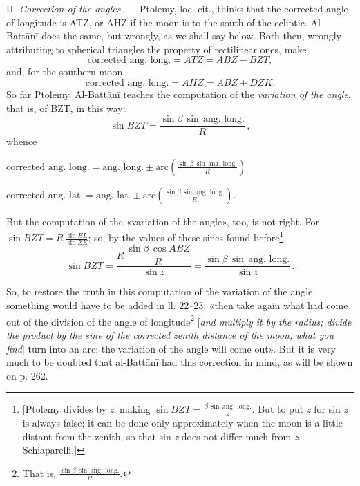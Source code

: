\documentclass[11pt]{article}
\newcommand{\Pg}[1]{\marginpar{\footnotesize\color{gray}#1}}
\begin{document}
\par \Pg{I 261}II. \emph{Correction of the angles.} — Ptolemy, loc. cit., thinks that the corrected angle of longitude is ATZ, or AHZ if the moon is to the south of the ecliptic. Al-Battānī does the same, but wrongly, as we shall say below. Both then, wrongly attributing to spherical triangles the property of rectilinear ones, make \[ \text{corrected ang. long.} = ATZ = ABZ - BZT, \] and, for the southern moon, \[ \text{corrected ang. long.} = AHZ = ABZ + DZK. \] So far Ptolemy. Al-Battānī teaches the computation of the \emph{variation of the angle}, that is, of BZT, in this way: \[ \sin BZT = \frac{\sin\beta\,\sin\,\text{ang. long.}}{R}\,, \] whence \par\noindent\hspace*{1.5em}$\displaystyle \text{corrected ang. long.} = \text{ang. long.} \pm \text{arc}\left(\frac{\sin\beta\,\sin\,\text{ang. long.}}{R}\right)$\par \par\noindent\hspace*{1.5em}$\displaystyle \text{corrected ang. lat.} = \text{ang. lat.} \pm \text{arc}\left(\frac{\sin\beta\,\sin\,\text{ang. long.}}{R}\right).$\par But the computation of the «variation of the angle», too, is not right. For $\sin BZT = R\,\frac{\sin EL}{\sin ZE}$; so, by the values of these sines found before\footnote{[Ptolemy divides by \emph{z}, making $\sin BZT = \frac{\beta\,\sin\,\text{ang. long.}}{z}$. But to put \emph{z} for sin \emph{z} is always false; it can be done only approximately when the moon is a little distant from the zenith, so that sin \emph{z} does not differ much from \emph{z}. — Schiaparelli.]}, \[ \sin BZT = \frac{R\,\dfrac{\sin\beta\,\cos ABZ}{R}}{\sin z} = \frac{\sin\beta\,\sin\,\text{ang. long.}}{\sin z}\,. \]\par
\begin{center}\end{center}
\par So, to restore the truth in this computation of the variation of the angle, something would have to be added in ll. 22–23: «then take again what had come out of the division of the angle of longitude\footnote{That is, $\frac{\sin\beta\,\sin\,\text{ang. long.}}{R}$.} [\emph{and multiply it by the radius; divide the product by the sine of the corrected zenith distance of the moon; what you find}] turn into an arc; the variation of the angle will come out». But it is very much to be doubted that al-Battānī had this correction in mind, as will be shown on p. 262.\par
\end{document}
